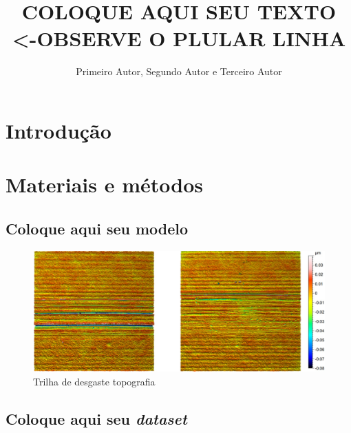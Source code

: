 \documentclass[isoft]{ufgtexposter}
\title{\uppercase{Coloque aqui seu texto\\<-observe o plular linha
}}
\author{Primeiro Autor, Segundo Autor e Terceiro Autor}
\begin{document}
    \begin{poster}
    
    \section{Introdução}
            \lipsum[3]
        
    \section{Materiais e métodos}%
        
        \subsection{Coloque aqui seu modelo}
        
        \lipsum[11]
        
        \vspace{0.1cm}
        
        \begin{figure}
            \centering
            \captionsetup{type=figure}
            \includegraphics[scale=0.8]{images/exemplo.jpg}
            \caption{Trilha de desgaste topografia}
            \label{fig:lstm}
        \end{figure}
        
        \subsection{Coloque aqui seu \textit{dataset}}
        
            \lipsum[54]
            

\end{poster}
\end{document}
